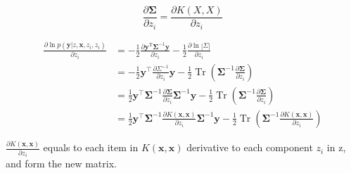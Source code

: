 \documentclass[11pt]{article}
\newcommand{\mbf}[1]{{\boldsymbol{\mathbf{#1}}}}
\renewcommand{\bm}{\mbf}
\begin{document}
\begin{enumerate}
\begin{equation}
    \frac{\partial \mathbf{\Sigma}}{\partial z_i} = \frac{\partial{K(X,X)}}{\partial{z_i}}
\end{equation}

\begin{align}
    \frac{\partial{\ln p(\bm{y} |z ,\bm{x}, z_i, z_i)}}{\partial{z_i}} 
    &=  -\frac{1}{2} \frac{\partial{\mathbf{y}^{\mathrm{T}} \boldsymbol{\Sigma}^{-1}\mathbf{y}}}{\partial{z_i}} - \frac{1}{2}\frac{\partial{\ln |\Sigma|}}{\partial{z_i}}\\
    &=  -\frac{1}{2} \bm{y}^{\top} \frac{\partial{\Sigma^{-1}}}{\partial{z_i}} \bm{y} - \frac{1}{2} \operatorname{Tr}\left(\mathbf{\Sigma}^{-1} \frac{\partial \mathbf{\Sigma}}{\partial z_i}\right) \\
    &=  \frac{1}{2} \bm{y}^{\top} \mathbf{\Sigma}^{-1} \frac{\partial \mathbf{\Sigma}}{\partial z_i} \mathbf{\Sigma}^{-1} \bm{y} - \frac{1}{2} \operatorname{Tr}\left(\mathbf{\Sigma}^{-1} \frac{\partial \mathbf{\Sigma}}{\partial z_i}\right) \\
    &=  \frac{1}{2} \bm{y}^{\top} \mathbf{\Sigma}^{-1}\frac{\partial{K(\bm{x},\bm{x})}}{\partial{z_i}} \mathbf{\Sigma}^{-1} \bm{y} - \frac{1}{2} \operatorname{Tr}\left(\mathbf{\Sigma}^{-1} \frac{\partial{K(\bm{x},\bm{x})}}{\partial{z_i}}\right)
\end{align}


$
    \frac{\partial{K(\bm{x},\bm{x})}}{\partial{z_i}}
$ equals to each item in $K(\bm{x},\bm{x})$ derivative to each component $z_i$ in z, and form the new matrix.














\end{enumerate}
\end{document}
